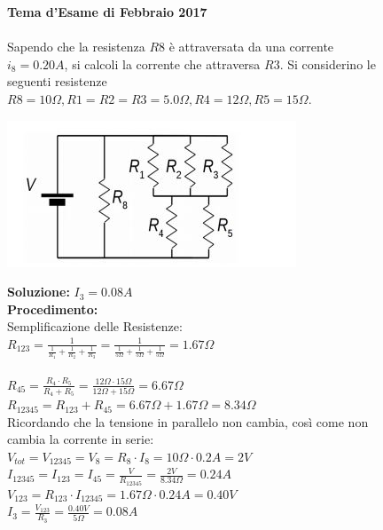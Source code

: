 \begin{figure}[h!]
\textbf{Tema d'Esame di Febbraio 2017}\\ \\
Sapendo che la resistenza $R8$ è attraversata da una corrente $i_8 = 0.20 A$, si calcoli la corrente che attraversa $R3$. Si considerino le seguenti resistenze $R8 = 10 \Omega, R1 = R2 = R3 = 5.0 \Omega , R4 = 12 \Omega , R5 = 15 \Omega $.
	\begin{center}
		\includegraphics[scale=1.1]{ES5/FEB052017.jpg}
	\end{center}
	\begin{boxed}
		\null\hfill \textbf{Soluzione:} $I_3 = 0.08A$\\
		\textbf{Procedimento: } \\
		Semplificazione delle Resistenze:\\
		$R_{123}=\frac{1}{\frac{1}{R_1}+\frac{1}{R_2}+\frac{1}{R_3}}=\frac{1}{\frac{1}{5\Omega}+\frac{1}{5\Omega}+\frac{1}{5\Omega}}=1.67\Omega$\\ \\ 
		$R_{45}=\frac{R_4\cdot R_5}{R_4 + R_5}=\frac{12\Omega\cdot 15\Omega}{12\Omega + 15\Omega}=6.67\Omega$\\
		$R_{12345}=R_{123}+R_{45}=6.67\Omega+1.67\Omega=8.34\Omega$\\
		Ricordando che la tensione in parallelo non cambia, così come non cambia la corrente in serie:\\
		$V_{tot}=V_{12345}=V_8=R_8\cdot I_8=10\Omega\cdot 0.2A=2V$\\
		$I_{12345}=I_{123}=I_{45}=\frac{V}{R_{12345}}=\frac{2V}{8.34\Omega}=0.24A$\\
		$V_{123}=R_{123}\cdot I_{12345}=1.67\Omega\cdot 0.24A=0.40V$\\
		$I_3=\frac{V_{123}}{R_3}=\frac{0.40V}{5\Omega}=0.08A$
	\end{boxed}
\end{figure}

